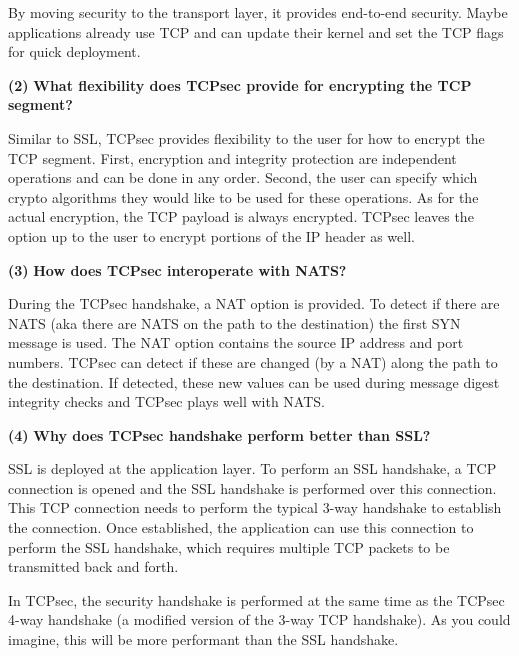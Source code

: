\documentclass[11pt]{article}
\renewcommand\part[1]{\vspace{.10in}\textbf{(#1)}}
\begin{document}
By moving security to the transport layer, it provides end-to-end security. Maybe applications already use TCP and can update their kernel and set the TCP flags for quick deployment.

\part{2} \textbf{What flexibility does TCPsec provide for encrypting the TCP segment?}

Similar to SSL, TCPsec provides flexibility to the user for how to encrypt the TCP segment. First, encryption and integrity protection are independent operations and can be done in any order. Second, the user can specify which crypto algorithms they would like to be used for these operations. As for the actual encryption, the TCP payload is always encrypted. TCPsec leaves the option up to the user to encrypt portions of the IP header as well. 

\part{3} \textbf{How does TCPsec interoperate with NATS?}

During the TCPsec handshake, a NAT option is provided. To detect if there are NATS (aka there are NATS on the path to the destination) the first SYN message is used. The NAT option contains the source IP address and port numbers. TCPsec can detect if these are changed (by a NAT) along the path to the destination. If detected, these new values can be used during message digest integrity checks and TCPsec plays well with NATS.

\part{4} \textbf{Why does TCPsec handshake perform better than SSL?}

SSL is deployed at the application layer. To perform an SSL handshake, a TCP connection is opened and the SSL handshake is performed over this connection. This TCP connection needs to perform the typical 3-way handshake to establish the connection. Once established, the application can use this connection to perform the SSL handshake, which requires multiple TCP packets to be transmitted back and forth.

In TCPsec, the security handshake is performed at the same time as the TCPsec 4-way handshake (a modified version of the 3-way TCP handshake). As you could imagine, this will be more performant than the SSL handshake.
\end{document}

